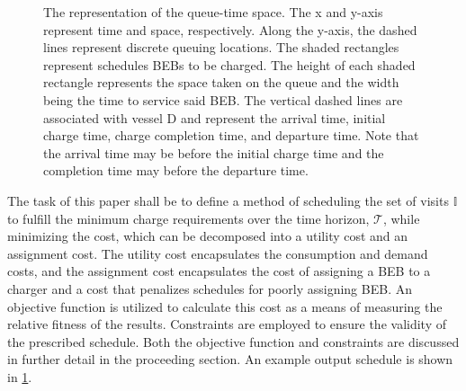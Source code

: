 \documentclass[11pt,a4paper,final]{article}
\newcommand{\T}{\mathcal{T}}                %
\newcommand{\I}{\mathbb{I}}                 %
\begin{document}
\begin{figure}[ht!]
{{
  }}
  \caption{The representation of the queue-time space. The x and y-axis represent time and space, respectively. Along the y-axis, the dashed lines represent discrete queuing locations. The shaded rectangles represent schedules BEBs to be charged. The height of each shaded rectangle represents the space taken on the queue and the width being the time to service said BEB. The vertical dashed lines are associated with vessel D and represent the arrival time, initial charge time, charge completion time, and departure time. Note that the arrival time may be before the initial charge time and the completion time may before the departure time.}
  \label{fig:spacial-and-temporal-constr}
\end{figure}

The task of this paper shall be to define a method of scheduling the set of visits \(\I\) to fulfill the minimum charge
requirements over the time horizon, \(\T\), while minimizing the cost, which can be decomposed into a utility cost and an
assignment cost. The utility cost encapsulates the consumption and demand costs, and the assignment cost encapsulates
the cost of assigning a BEB to a charger and a cost that penalizes schedules for poorly assigning BEB. An objective
function is utilized to calculate this cost as a means of measuring the relative fitness of the results. Constraints are
employed to ensure the validity of the prescribed schedule. Both the objective function and constraints are discussed in
further detail in the proceeding section. An example output schedule is shown in \ref{fig:spacial-and-temporal-constr}.
\end{document}
